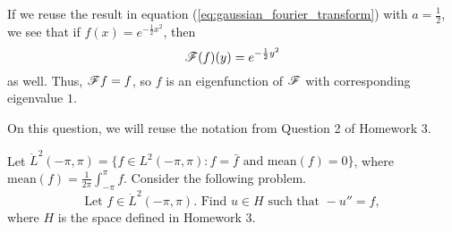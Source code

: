 \documentclass{homework}
\begin{document}
\begin{arabicparts}
		\questionpart If we reuse the result in equation (\ref{eq:gaussian_fourier_transform}) with $a = \frac{1}{2}$, we see that if $f(x) = e^{-\frac{1}{2}x^2}$, then
		\begin{equation}
			\mathscr{F}(f)(y) = e^{-\frac{1}{2}y^2}
		\end{equation}
		as well. Thus, $\mathscr{F} f = f$, so $f$ is an eigenfunction of $\mathscr{F}$ with corresponding eigenvalue $1$.
	\end{arabicparts}
	
	\question
	On this question, we will reuse the notation from Question 2 of Homework 3.
	
	Let $\dot{L}^2(-\pi, \pi) = \{f \in L^2(-\pi, \pi) : f = \bar{f}\text{ and } \mathrm{mean}(f) = 0\}$, where $\mathrm{mean}(f) = \frac{1}{2\pi}\int_{-\pi}^\pi f$. Consider the following problem.
	\begin{equation}
		\label{eq:q2_problem}
		\text{Let } f\in \dot{L}^2(-\pi,\pi). \text{ Find } u\in H \text{ such that } -u'' = f,
	\end{equation}
	where $H$ is the space defined in Homework 3.
\end{document}
